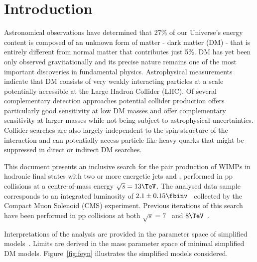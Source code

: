 \section{Introduction}
\label{sec:introduction}


Astronomical observations have determined that 27\% of our Universe’s energy content is composed of an unknown form of matter - dark matter (DM) - that is entirely different from normal matter that contributes just 5\%. DM has yet been only observed gravitationally and its precise nature remains one of the most important discoveries in fundamental physics. Astrophysical measurements indicate that DM consists of very weakly interacting particles at a scale potentially accessible at the Large Hadron Collider (LHC). Of several complementary detection approaches potential collider production offers particularly good sensitivity at low DM masses and offer complementary sensitivity at larger masses while not being  subject to astrophysical uncertainties. Collider searches are also largely independent to the spin-structure of the interaction and can potentially access particle like heavy quarks that might be suppressed in direct or indirect DM searches.



This document presents an inclusive search for the pair production of WIMPs in hadronic final states with two or more
energetic jets and \met, performed in pp collisions at a centre-of-mass energy $\sqrt{s} = 13\TeV$. The analysed data sample
corresponds to an integrated luminosity of $2.1 \pm 0.15 \fbinv$~\cite{lumi} collected by the Compact Muon Solenoid (CMS)
experiment. Previous iterations of this search have been performed in
pp collisions at both $\sqrt{s} = 7$~\cite{RA1Paper, RA1Paper2011, RA1Paper2011FULL} and $8\TeV$~\cite{RA1Paper2012}.

Interpretations of the analysis are provided in the parameter space of simplified models~\cite{Alwall:2008ag, Alwall:2008va, sms}. Limits are derived in the mass parameter space of minimal simplified DM models. Figure~\ref{fig:feyn} illustrates the simplified models considered.

